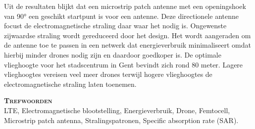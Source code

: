 Uit de resultaten blijkt dat een microstrip patch antenne
met een openingshoek van \ang{90} een geschikt startpunt is voor een antenne.
Deze directionele  antenne focust de electromagnetische straling daar waar het nodig is.
Ongewenste zijwaardse straling wordt gereduceerd door het design.
Het wordt aangeraden om de antenne toe te passen in een netwerk dat energieverbruik minimaliseert
omdat hierbij minder drones nodig zijn en daardoor goedkoper is.
De optimale vlieghoogte voor het stadscentrum in Gent bevindt zich rond 80  meter.
Lagere vlieghoogtes vereisen veel meer drones terwijl hogere vlieghoogtes de 
electromagnetische straling laten toenemen.

\textsc{\textbf{\LARGE Trefwoorden}}\\
LTE, Electromagnetische blootstelling, 
Energieverbruik, Drone,
Femtocell, Microstrip patch antenna, Stralingspatronen, Specific absorption rate (SAR).

